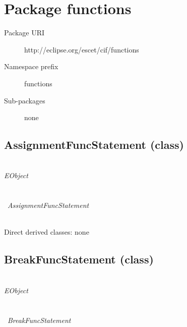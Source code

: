 \section{Package functions}\label{cifpkg:functions}
\pkgdocufunctions

\begin{description}
\item[Package URI] http://eclipse.org/escet/cif/functions
\item[Namespace prefix] functions
\item[Sub-packages] none
\end{description}

\subsection{AssignmentFuncStatement (class)}\label{cifclass:AssignmentFuncStatement}
\clsdocuAssignmentFuncStatement

~\\ \noindent \emph{EObject} \\
\hook~ \\
\hookindent\hook~ \\
\hookindent\hookindent\hook~\emph{AssignmentFuncStatement}

~\\ \noindent Direct derived classes:
none

\begin{description}
{\featdocuPositionObjectposition}
{\featdocuAssignmentFuncStatementaddressable}
{\featdocuAssignmentFuncStatementvalue}
\end{description}


\subsection{BreakFuncStatement (class)}\label{cifclass:BreakFuncStatement}
\clsdocuBreakFuncStatement

~\\ \noindent \emph{EObject} \\
\hook~ \\
\hookindent\hook~ \\
\hookindent\hookindent\hook~\emph{BreakFuncStatement}

